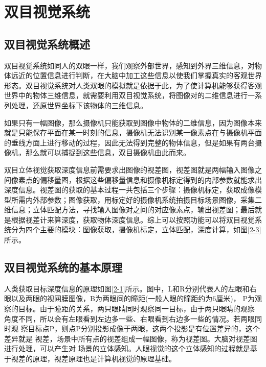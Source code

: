 
\chapter{双目视觉系统}

\section{双目视觉系统概述}
双目视觉系统如同人的双眼一样，我们观察外部世界，感知到外界三维信息，对物体远近的位置信息进行判断，在大脑中加工这些信息以使我们掌握真实的客观世界形态。双目视觉系统对人类双眼的模拟就是依据于此，为了使计算机能够获得客观世界中的物体三维信息，就需要利用双目视觉系统，将图像对的二维信息进行一系列处理，还原世界坐标下该物体的三维信息。

如果只有一幅图像，那么摄像机只能获取到图像中物体的二维信息，因为图像本来就是只能保存平面在某一时刻的信息，摄像机无法识别某一像素点在与摄像机平面的垂线方面上进行移动的过程，因此无法得到完整的物体信息，但是如果有两台摄像机，那么就可以捕捉到这些信息，双目摄像机由此而来。

双目立体视觉获取深度信息前需要求出图像的视差图，视差图就是两幅输入图像之间像素点的偏移量图，根据这些偏移量信息和摄像机标定得到的内部参数就能求出深度信息。视差图的获取的基本过程一共包括三个步骤：摄像机标定，获取成像模型所需内外部参数；图像获取，用标定好的摄像机系统拍摄目标场景图像，采集二维信息；立体匹配方法，寻找输入图像对之间的对应像素点，输出视差图；最后就是根据视差计来算深度，获取物体深度信息。综上可以按照功能可以将双目视觉系统分为四个主要的模块：图像获取，摄像机标定，立体匹配，深度计算，如图\ref{2-3}所示。


\section{双目视觉系统的基本原理}

人类获取目标深度信息的原理如图\ref{2-1}所示。图中，L和R分别代表人的左眼和右眼以及两眼的视网膜图像，B为两眼间的瞳距(一般人眼的瞳距约为6厘米)，
P为观察的目标。由于瞳距的关系，两只眼睛同时观察同一目标，由于两只眼睛的观察
角度不同，所以会有左眼看到左边多一些、右眼看到右边多一些的情况。若两眼同时观
察目标点P，则点P分别投影成像于两眼，这两个投影是有位置差异的，这个差异就是
视差，场景中所有点的视差组成一幅图像，称为视差图。大脑对视差图进行处理，可以产生对
场景的立体感知。人眼视觉的这个立体感知的过程就是基于视差的原理，视差原理也是计算机视觉的原理基础。


